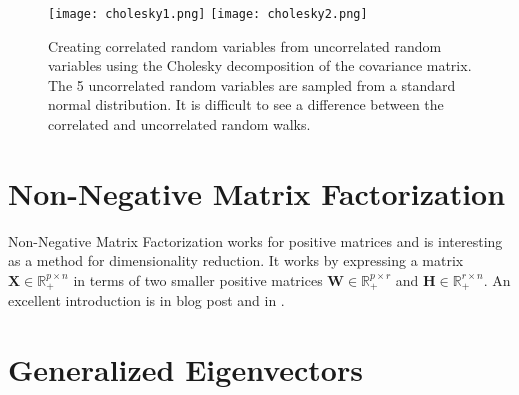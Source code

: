 \begin{figure}
\centering
\texttt{[image: cholesky1.png]}
\texttt{[image: cholesky2.png]}
\caption{Creating correlated random variables from uncorrelated random variables using the Cholesky decomposition of the covariance matrix. The 5 uncorrelated random variables are sampled from a standard normal distribution. It is difficult to see a difference between the correlated and uncorrelated random walks.}
\end{figure}

\section{Non-Negative Matrix Factorization}
Non-Negative Matrix Factorization works for positive matrices and is interesting as a method for dimensionality reduction. It works by expressing a matrix $\mathbf{X}\in\mathbb{R}^{p\times n}_+$ in terms of two smaller positive matrices $\mathbf{W}\in\mathbb{R}_+^{p\times r}$ and $\mathbf{H}\in \mathbb{R}^{r\times n}_+$. An excellent introduction is in  blog post and in . 


\section{Generalized Eigenvectors}









\chapauthor{}
